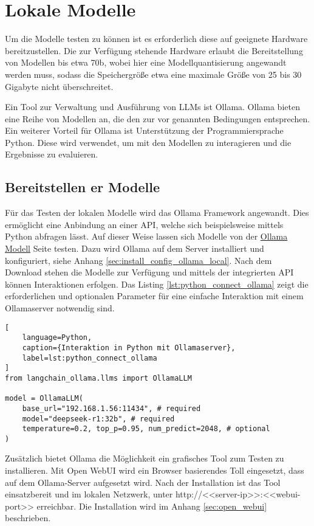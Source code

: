 \section{Lokale Modelle}
Um die Modelle testen zu können ist es erforderlich diese auf geeignete Hardware bereitzustellen. Die zur Verfügung stehende Hardware erlaubt die Bereitstellung von Modellen bis etwa 70b, wobei hier eine Modellquantisierung angewandt werden muss, sodass die Speichergröße etwa eine maximale Größe von 25 bis 30 Gigabyte nicht überschreitet.\vspace{0.2cm}

Ein Tool zur Verwaltung und Ausführung von LLMs ist Ollama. Ollama bieten eine Reihe von Modellen an, die den zur vor genannten Bedingungen entsprechen. Ein weiterer Vorteil für Ollama ist Unterstützung der Programmiersprache Python. Diese wird verwendet, um mit den Modellen zu interagieren und die Ergebnisse zu evaluieren.


\subsection{Bereitstellen er Modelle}
Für das Testen der lokalen Modelle wird das Ollama Framework angewandt. Dies ermöglicht eine Anbindung an einer API, welche sich beispielsweise mittels Python abfragen lässt. Auf dieser Weise lassen sich Modelle von der \href{https://ollama.com/search}{Ollama Modell} Seite testen. Dazu wird Ollama auf dem Server installiert und konfiguriert, siehe Anhang \ref{sec:install_config_ollama_local}. Nach dem Download stehen die Modelle zur Verfügung und mittels der integrierten API können Interaktionen erfolgen. Das Listing \ref{lst:python_connect_ollama} zeigt die erforderlichen und optionalen Parameter für eine einfache Interaktion mit einem Ollamaserver notwendig sind.\vspace{0.2cm}

\begin{lstlisting}[
	language=Python,
	caption={Interaktion in Python mit Ollamaserver},
	label=lst:python_connect_ollama
]
from langchain_ollama.llms import OllamaLLM

model = OllamaLLM(
    base_url="192.168.1.56:11434", # required
    model="deepseek-r1:32b", # required
    temperature=0.2, top_p=0.95, num_predict=2048, # optional
)
\end{lstlisting}

Zusätzlich bietet Ollama die Möglichkeit ein grafisches Tool zum Testen zu installieren. Mit Open WebUI wird ein Browser basierendes Toll eingesetzt, dass auf dem Ollama-Server aufgesetzt wird. Nach der Installation ist das Tool einsatzbereit und im lokalen Netzwerk, unter http://<<server-ip>>:<<webui-port>> erreichbar. Die Installation wird im Anhang \ref{sec:open_webui} beschrieben.


